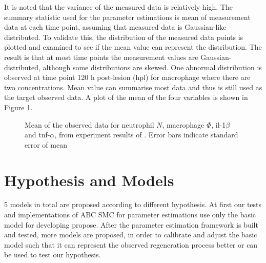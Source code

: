 \documentclass[12pt,a4paper]{report}
\begin{document}
It is noted that the variance of the measured data is relatively high. The summary statistic used for the parameter estimations is mean of measurement data at each time point, assuming that measured data is Gaussian-like distributed. To validate this, the distribution of the measured data points is plotted and examined to see if the mean value can represent the distribution. The result is that at most time points the measurement values are Gaussian-distributed, although some distributions are skewed. One abnormal distribution is observed at time point 120 h post-lesion (hpl) for macrophage where there are two concentrations. Mean value can summarise most data and thus is still used as the target observed data. A plot of the mean of the four variables is shown in Figure \ref{fig:obs_data}.

\begin{figure}
\begin{center}
\end{center}

\caption[Mean of the observed data]%
{Mean of the observed data for neutrophil $N$, macrophage $\Phi$, il-1$\beta$ and tnf-$\alpha$, from experiment results of \cite{ref:Tsarouchas}. Error bars indicate standard error of mean} 
\label{fig:obs_data}

\end{figure}

\section{Hypothesis and Models}

5 models in total are proposed according to different hypothesis. At first our tests and implementations of ABC SMC for parameter estimations use only the basic model for developing propose. After the parameter estimation framework is built and tested, more models are proposed, in order to calibrate and adjust the basic model such that it can represent the observed regeneration process better or can be used to test our hypothesis. 
\end{document}

